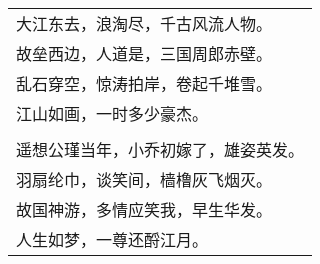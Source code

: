 \noindent\begin{minipage}{\linewidth}
  \vskip-3pt\begin{table}[H]
    \centering
    \begin{tabular}{@{}l@{}}
大江东去，浪淘尽，千古风流人物。\\
故垒西边，人道是，三国周郎赤壁。\\
乱石穿空，惊涛拍岸，卷起千堆雪。\\
江山如画，一时多少豪杰。\\
\\
遥想公瑾当年，小乔初嫁了，雄姿英发。\\
羽扇纶巾，谈笑间，樯橹灰飞烟灭。\\
故国神游，多情应笑我，早生华发。\\
人生如梦，一尊还酹江月。
    \end{tabular}
  \end{table}
\end{minipage}
\vspace{1cm}


